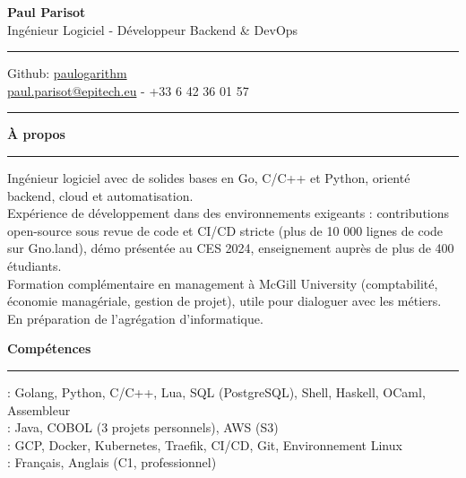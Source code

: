 \documentclass[9pt]{extarticle}
\begin{document}
\begin{center}
	{\huge\bfseries Paul Parisot}
	\\[9pt]
	{\Large Ingénieur Logiciel - Développeur Backend \& DevOps}
	\\
\end{center}

\par\vspace{-5pt}
\rule{\linewidth}{0.4pt}
\par\vspace{-5pt}

\begin{center}
	Github: \href{https://github.com/paulogarithm}{paulogarithm}
	\\
	\href{mailto:paul.parisot@epitech.eu}{paul.parisot@epitech.eu} - +33 6 42 36 01 57
	\\
\end{center}

\par\vspace{-10pt}
\rule{\linewidth}{0.4pt}
\par\vspace{7pt}

{\large\bfseries À propos}
\par\vspace{-8pt}
\rule{\linewidth}{0.4pt}
\par\vspace{5pt}

Ingénieur logiciel avec de solides bases en Go, C/C++ et Python, orienté backend, cloud et automatisation.
\\
Expérience de développement dans des environnements exigeants : contributions open-source sous revue de code et CI/CD stricte (plus de 10 000 lignes de code sur Gno.land), démo présentée au CES 2024, enseignement auprès de plus de 400 étudiants.
\\
Formation complémentaire en management à McGill University (comptabilité, économie managériale, gestion de projet), utile pour dialoguer avec les métiers. En préparation de l'agrégation d'informatique.
\par\vspace{5pt}

{\large\bfseries Compétences}
\par\vspace{-8pt}
\rule{\linewidth}{0.4pt}
\par\vspace{5pt}

\hspace*{5pt}{\bfseries Maîtrise}: Golang, Python, C/C++, Lua, SQL (PostgreSQL), Shell, Haskell, OCaml, Assembleur
\\
\hspace*{5pt}{\bfseries Notions}: Java, COBOL (3 projets personnels), AWS (S3)
\\
\hspace*{5pt}{\bfseries Cloud \& DevOps}: GCP, Docker, Kubernetes, Traefik, CI/CD, Git, Environnement Linux
\\
\hspace*{5pt}{\bfseries Langues}: Français, Anglais (C1, professionnel)
\end{document}
